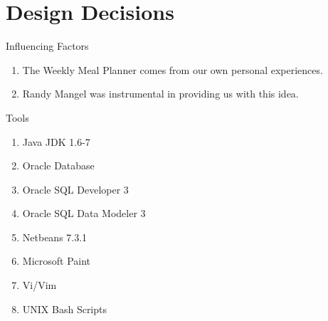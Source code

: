 \documentclass[a4paper,10pt,toc=graduated]{article}
\begin{document}
\section{Design Decisions}
\begin{mySubsection}{Influencing Factors}
\begin{enumerate}
\item The Weekly Meal Planner comes from our own personal experiences.
\item Randy Mangel was instrumental in providing us with this idea.
\end{enumerate}
\end{mySubsection}
\begin{mySubsection}{Tools}
\begin{enumerate}
\item Java JDK 1.6-7
\item Oracle Database
\item Oracle SQL Developer 3
\item Oracle SQL Data Modeler 3
\item Netbeans 7.3.1
\item Microsoft Paint
\item Vi/Vim
\item UNIX Bash Scripts
\end{enumerate}
\end{mySubsection}
\end{document}
